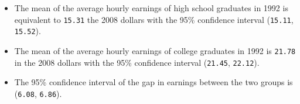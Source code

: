 \documentclass[a4paper,11pt]{article}
\begin{document}
\begin{itemize}
\item The mean of the average hourly earnings of high school graduates in
1992 is equivalent to \texttt{15.31} the
2008 dollars with the 95\%
confidence interval (\texttt{15.11},
\texttt{15.52}).
\item The mean of the average hourly earnings of college graduates in 1992
is \texttt{21.78} in the 2008 dollars with
the 95\% confidence interval
(\texttt{21.45},
\texttt{22.12}).
\item The 95\% confidence interval of the gap in earnings between the two
groups is
(\texttt{6.08},
\texttt{6.86}).
\end{itemize}
\end{document}
